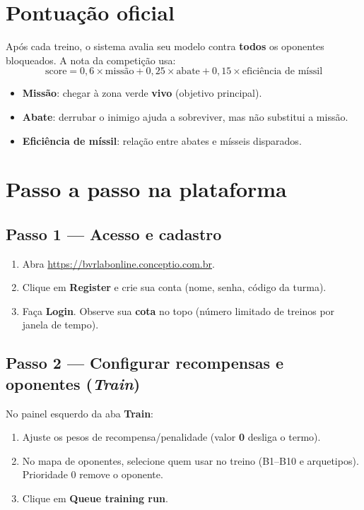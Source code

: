 \documentclass[11pt,a4paper]{article}
\begin{document}
\section{Pontuação oficial}
Após cada treino, o sistema avalia seu modelo contra \textbf{todos} os oponentes bloqueados.
A nota da competição usa:
\[
  \text{score} = 0{,}6 \times \text{missão} + 0{,}25 \times \text{abate} + 0{,}15 \times \text{eficiência de míssil}
\]
\begin{itemize}[nosep]
  \item \textbf{Missão}: chegar à zona verde \textbf{vivo} (objetivo principal).
  \item \textbf{Abate}: derrubar o inimigo ajuda a sobreviver, mas não substitui a missão.
  \item \textbf{Eficiência de míssil}: relação entre abates e mísseis disparados.
\end{itemize}

\section{Passo a passo na plataforma}

\subsection*{Passo 1 — Acesso e cadastro}
\begin{enumerate}[label=\textbf{\arabic*.}]
  \item Abra \url{https://bvrlabonline.conceptio.com.br}.
  \item Clique em \textbf{Register} e crie sua conta (nome, senha, código da turma).
  \item Faça \textbf{Login}. Observe sua \textbf{cota} no topo (número limitado de treinos por janela de tempo).
\end{enumerate}

\subsection*{Passo 2 — Configurar recompensas e oponentes (\emph{Train})}
No painel esquerdo da aba \textbf{Train}:
\begin{enumerate}[label=\textbf{\arabic*.},start=4]
  \item Ajuste os pesos de recompensa/penalidade (valor \textbf{0} desliga o termo).
  \item No mapa de oponentes, selecione quem usar no treino (B1--B10 e arquetipos). Prioridade 0 remove o oponente.
  \item Clique em \textbf{Queue training run}.
\end{enumerate}
\end{document}
